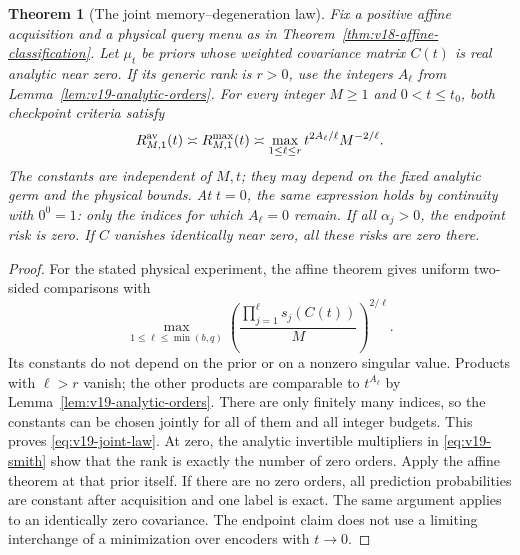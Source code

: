 \documentclass[11pt]{amsart}
\newtheorem{theorem}{Theorem}[section]
\theoremstyle{definition}\newtheorem{definition}[theorem]{Definition}
\theoremstyle{remark}\newtheorem{remark}[theorem]{Remark}
\begin{document}
\begin{theorem}[The joint memory--degeneration law]
\label{thm:v19-analytic-memory}
Fix a positive affine acquisition and a physical query menu as in
Theorem~\ref{thm:v18-affine-classification}. Let $\mu_t$ be priors
whose weighted covariance matrix $C(t)$ is real analytic near zero.
If its generic rank is $r>0$, use the integers $A_\ell$ from
Lemma~\ref{lem:v19-analytic-orders}. For every integer $M\ge1$ and
$0<t\le t_0$, both checkpoint criteria satisfy
\begin{equation}\label{eq:v19-joint-law}
 R^{\rm av}_{M,1}(t)\asymp R^{\rm max}_{M,1}(t)
 \asymp\max_{1\le\ell\le r}
                 t^{2A_\ell/\ell}M^{-2/\ell}.
\end{equation}
The constants are independent of $M,t$; they may depend on the fixed
analytic germ and the physical bounds. At $t=0$, the same expression
holds by continuity with $0^0=1$: only the indices for which
$A_\ell=0$ remain. If all $\alpha_j>0$, the endpoint risk is zero.
If $C$ vanishes identically near zero, all these risks are zero there.
\end{theorem}
\begin{proof}
For the stated physical experiment, the affine theorem gives uniform
two-sided comparisons with
\[
 \max_{1\le\ell\le\min(b,q)}
 \left(\frac{\prod_{j=1}^{\ell}s_j(C(t))}{M}\right)^{2/\ell}.
\]
Its constants do not depend on the prior or on a nonzero singular
value. Products with $\ell>r$ vanish; the other products are comparable
to $t^{A_\ell}$ by Lemma~\ref{lem:v19-analytic-orders}. There are
only finitely many indices, so the constants can be chosen jointly
for all of them and all integer budgets. This proves
\eqref{eq:v19-joint-law}. At zero, the analytic invertible
multipliers in \eqref{eq:v19-smith} show that the rank is exactly
the number of zero orders. Apply the affine theorem at that prior
itself. If there are no zero orders, all prediction probabilities
are constant after acquisition and one label is exact. The same
argument applies to an identically zero covariance. The endpoint
claim does not use a limiting interchange of a minimization over
encoders with $t\to0$.
\end{proof}
\end{document}
